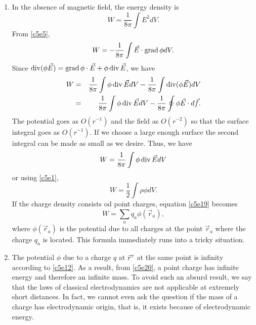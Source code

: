 \begin{enumerate}
\item In the absence of magnetic field, the energy density is
\begin{equation}\label{c5e18}
W = \frac{1}{8\pi}\int E^2dV.
\end{equation}
From \eqref{c5e5},
\[
W = -\frac{1}{8\pi}\int\vec{E}\cdot\operatorname{grad}\phi dV.
\]
Since $\operatorname{div}(\phi\vec{E}) = \operatorname{grad}\phi\cdot\vec{E} + \phi\operatorname{div}\vec{E}$, we have
\begin{eqnarray*}
W &=& \frac{1}{8\pi}\int\phi\operatorname{div}\vec{E}dV - \frac{1}{8\pi}\int\operatorname{div}(\phi\vec{E})dV \\
  &=& \frac{1}{8\pi}\int\phi\operatorname{div}\vec{E}dV - \frac{1}{8\pi}\oint \phi\vec{E}\cdot d\vec{f}.
\end{eqnarray*}
The potential goes as $O(r^{-1})$ and the field as $O(r^{-2})$ so that the surface
integral goes as $O(r^{-1})$. If we choose a large enough surface the second 
integral can be made as small as we desire. Thus, we have
\[
W = \frac{1}{8\pi}\int\phi\operatorname{div}\vec{E}dV
\]
or using \eqref{c5e1},
\begin{equation}\label{c5e19}
W = \frac{1}{2}\int\rho\phi dV.
\end{equation}
If the charge density consists od point charges, equation \eqref{c5e19} becomes
\begin{equation}\label{c5e20}
W = \sum_a q_a\phi(\vec{r}_a),
\end{equation}
where $\phi(\vec{r}_a)$ is the potential due to all charges at the point 
$\vec{r}_a$ where the charge $q_a$ is located. This formula immediately runs 
into a tricky situation.

\item The potential $\phi$ due to a charge $q$ at $\vec{r}^{\,\prime}$ at the same point
is infinity according to \eqref{c5e12}. As a result, from \eqref{c5e20}, a point
charge has infinite energy and therefore an infinite mass. To avoid such an absurd
result, we say that the laws of classical electrodynamics are not applicable at
extremely short distances. In fact, we cannot even ask the question if the mass of
a charge has electrodynamic origin, that is, it exists because of electrodynamic
energy.


\end{enumerate}
